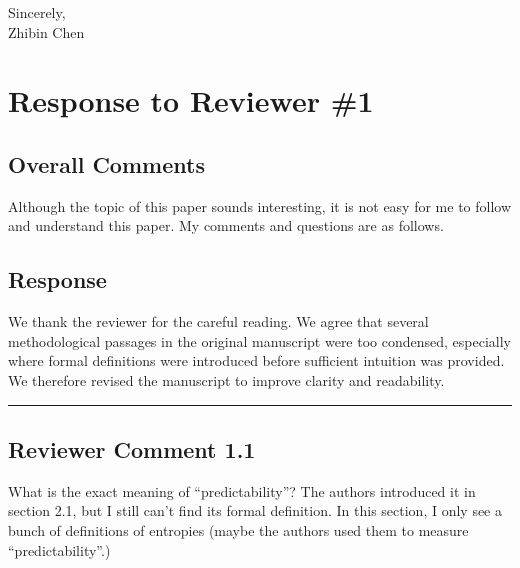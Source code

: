 \documentclass{NSF}
\begin{document}
\vskip 0.2in
\noindent Sincerely, \\
\noindent Zhibin Chen

\newpage
\section{Response to Reviewer \#1}
\subsection*{Overall Comments}
\begin{mdframed}
Although the topic of this paper sounds interesting, it is not easy for me to follow and understand this paper. My comments and questions are as follows.
\end{mdframed}
\subsection{Response}
We thank the reviewer for the careful reading. We agree that several methodological passages in the original manuscript were too condensed, especially where formal definitions were introduced before sufficient intuition was provided. We therefore revised the manuscript to improve clarity and readability.

\noindent\rule{16.5cm}{1.0pt}

\subsection{Reviewer Comment 1.1}
\begin{mdframed}
What is the exact meaning of ``predictability''? The authors introduced it in section 2.1, but I still can't find its formal definition. In this section, I only see a bunch of definitions of entropies (maybe the authors used them to measure ``predictability''.)
\end{mdframed}
\end{document}
